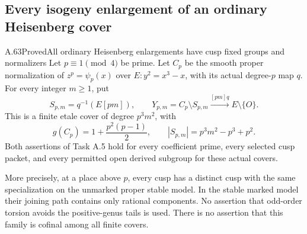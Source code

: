 \subsection{Every isogeny enlargement of an ordinary Heisenberg cover}

\begin{statement}{A.63}{Proved}{All ordinary Heisenberg enlargements have cusp fixed groups and normalizers}
Let \(p\equiv1\pmod4\) be prime. Let \(C_p\) be the smooth
proper normalization of \(z^p=\psi_p(x)\) over
\(E:y^2=x^3-x\), with its actual degree-\(p\) map \(q\).
For every integer \(m\ge1\), put
\[
 S_{p,m}=q^{-1}(E[pm]),\qquad
 Y_{p,m}=C_p\setminus S_{p,m}
       \xrightarrow{[pm]q} E\setminus\{O\}.
                                                        \tag{A.63.1}
\]
This is a finite etale cover of degree \(p^3m^2\), with
\[
 g(C_p)=1+\frac{p^2(p-1)}2,\qquad
 |S_{p,m}|=p^3m^2-p^3+p^2.                              \tag{A.63.2}
\]
Both assertions of Task A.5 hold for every
coefficient prime, every selected cusp packet, and every
permitted open derived subgroup for these actual covers.

More precisely, at a place above \(p\), every cusp has a
distinct cusp with the same specialization on the unmarked
proper stable model. In the stable marked model their joining
path contains only rational components. No assertion that
odd-order torsion avoids the positive-genus tails is used.
There is no assertion that this family is cofinal among all
finite covers.
\end{statement}

